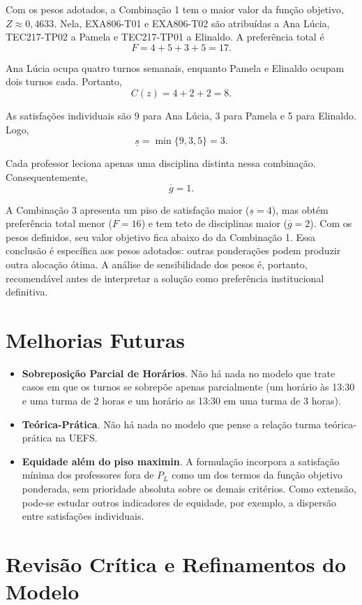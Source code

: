 \documentclass[11pt,a4paper]{article}
\begin{document}
Com os pesos adotados, a Combinação 1 tem o maior valor da função objetivo, $Z\approx0{,}4633$. Nela, EXA806-T01 e EXA806-T02 são atribuídas a Ana Lúcia, TEC217-TP02 a Pamela e TEC217-TP01 a Elinaldo. A preferência total é
\[
F=4+5+3+5=17.
\]

Ana Lúcia ocupa quatro turnos semanais, enquanto Pamela e Elinaldo ocupam dois turnos cada. Portanto,
\[
C(z)=4+2+2=8.
\]

As satisfações individuais são 9 para Ana Lúcia, 3 para Pamela e 5 para Elinaldo. Logo,
\[
\underline{s}=\min\{9,3,5\}=3.
\]

Cada professor leciona apenas uma disciplina distinta nessa combinação. Consequentemente,
\[
\overline{g}=1.
\]

A Combinação 3 apresenta um piso de satisfação maior ($\underline{s}=4$), mas obtém preferência total menor ($F=16$) e tem teto de disciplinas maior ($\overline{g}=2$). Com os pesos definidos, seu valor objetivo fica abaixo do da Combinação 1. Essa conclusão é específica aos pesos adotados: outras ponderações podem produzir outra alocação ótima. A análise de sensibilidade dos pesos é, portanto, recomendável antes de interpretar a solução como preferência institucional definitiva.

\section{Melhorias Futuras}
\begin{itemize}
    \item \textbf{Sobreposição Parcial de Horários}. Não há nada no modelo que trate casos em que os turnos se sobrepõe apenas parcialmente (um horário às 13:30 e uma turma de 2 horas e um horário as 13:30 em uma turma de 3 horas).
    \item \textbf{Teórica-Prática}. Não há nada no modelo que pense a relação turma teórica-prática na UEFS.
    \item \textbf{Equidade além do piso maximin}. A formulação incorpora a satisfação mínima dos professores fora de $P_L$ como um dos termos da função objetivo ponderada, sem prioridade absoluta sobre os demais critérios. Como extensão, pode-se estudar outros indicadores de equidade, por exemplo, a dispersão entre satisfações individuais.
\end{itemize}

\section{Revisão Crítica e Refinamentos do Modelo}\label{sec:refinamentos}
\end{document}
